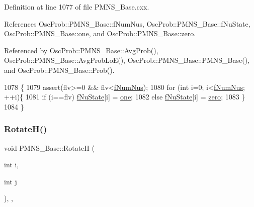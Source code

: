 Definition at line 1077 of file P\+M\+N\+S\+\_\+\+Base.\+cxx.



References Osc\+Prob\+::\+P\+M\+N\+S\+\_\+\+Base\+::f\+Num\+Nus, Osc\+Prob\+::\+P\+M\+N\+S\+\_\+\+Base\+::f\+Nu\+State, Osc\+Prob\+::\+P\+M\+N\+S\+\_\+\+Base\+::one, and Osc\+Prob\+::\+P\+M\+N\+S\+\_\+\+Base\+::zero.



Referenced by Osc\+Prob\+::\+P\+M\+N\+S\+\_\+\+Base\+::\+Avg\+Prob(), Osc\+Prob\+::\+P\+M\+N\+S\+\_\+\+Base\+::\+Avg\+Prob\+Lo\+E(), Osc\+Prob\+::\+P\+M\+N\+S\+\_\+\+Base\+::\+P\+M\+N\+S\+\_\+\+Base(), and Osc\+Prob\+::\+P\+M\+N\+S\+\_\+\+Base\+::\+Prob().


\begin{DoxyCode}
1078 \{
1079   assert(flv>=0 && flv<\hyperlink{classOscProb_1_1PMNS__Base_a24bb74bed63569dfe88b18fa6a08060e}{fNumNus});
1080   \textcolor{keywordflow}{for} (\textcolor{keywordtype}{int} i=0; i<\hyperlink{classOscProb_1_1PMNS__Base_a24bb74bed63569dfe88b18fa6a08060e}{fNumNus}; ++i)\{
1081     \textcolor{keywordflow}{if} (i==flv) \hyperlink{classOscProb_1_1PMNS__Base_abf99f2339e3ee989600740b5d88063e8}{fNuState}[i] = \hyperlink{classOscProb_1_1PMNS__Base_a7d1d0bbcab30a1fd8c368c40134c51ff}{one};
1082     \textcolor{keywordflow}{else}        \hyperlink{classOscProb_1_1PMNS__Base_abf99f2339e3ee989600740b5d88063e8}{fNuState}[i] = \hyperlink{classOscProb_1_1PMNS__Base_a05e595848c2521dc795efa7645728b94}{zero};
1083   \}
1084 \}
\end{DoxyCode}
\mbox{\label{classOscProb_1_1PMNS__Base_aae18afd69074211335f49ec40e6011b9}} 
\subsubsection{\texorpdfstring{Rotate\+H()}{RotateH()}}
{\footnotesize\ttfamily void P\+M\+N\+S\+\_\+\+Base\+::\+RotateH (\begin{DoxyParamCaption}\item[{int}]{i,  }\item[{int}]{j }\end{DoxyParamCaption})\hspace{0.3cm}{\ttfamily [protected]}, {\ttfamily [virtual]}, {\ttfamily [inherited]}}

